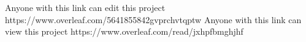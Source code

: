 Anyone with this link can edit this project
https://www.overleaf.com/5641855842gvprchvtqptw
Anyone with this link can view this project
https://www.overleaf.com/read/jxhpfbmghjhf